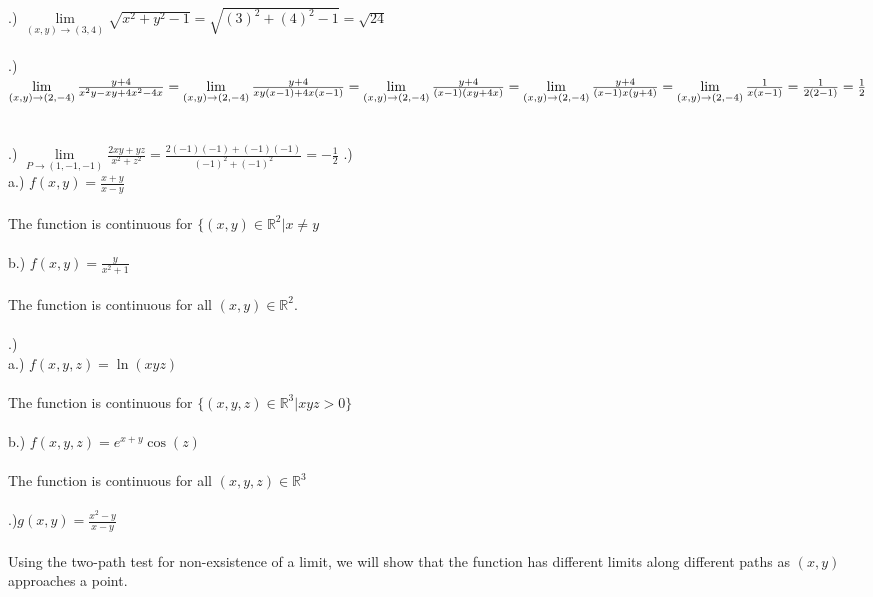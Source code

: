 \documentclass[12pt]{article}
\begin{document}
.) $\lim\limits_{(x,y) \to (3,4)} \sqrt{x^{2} + y^{2} - 1} = \sqrt{(3)^{2} + (4)^{2} -1} = \sqrt{24}$\\\\
.) $\lim\limits_{(x,y) \to (2,-4)} \frac{y+4}{x^{2}y -xy + 4x^{2} - 4x} 
\\\\= \lim\limits_{(x,y) \to (2,-4)} \frac{y+4}{xy(x-1)+4x(x-1)}
\\\\=\lim\limits_{(x,y) \to (2,-4)} \frac{y+4}{(x-1)(xy +4x)} 
\\\\=\lim\limits_{(x,y) \to (2,-4)} \frac{y+4}{(x-1)x(y +4)}
\\\\= \lim\limits_{(x,y) \to (2,-4)} \frac{1}{x(x-1)} = \frac{1}{2(2-1)} = \frac{1}{2}$\\\\\\

.) $\lim\limits_{P \to (1, -1, -1)}\frac{2xy+yz}{x^{2}+z^{2}} = \frac{2(-1)(-1) + (-1)(-1)}{(-1)^{2} + (-1)^{2}} = -\frac{1}{2}$
\clearpage
{}.) \\
\noindent a.) $f(x, y) = \frac{x+y}{x-y}$\\\\
\noindent The function is continuous for $\{ (x,y) \in \mathbb{R}^{2} | x \neq y$\\\\
\noindent b.) $f(x,y) = \frac{y}{x^{2} + 1}$\\\\
\noindent The function is continuous for all $ (x,y) \in \mathbb{R}^{2}$.\\\\
.) \\
\noindent a.) $f(x, y,z) = \ln(xyz)$\\\\
\noindent The function is continuous for $\{ (x,y,z) \in \mathbb{R}^{3} | xyz > 0\}$\\\\
\noindent b.) $f(x, y,z) = e^{x+y}\cos(z)$\\\\
\noindent The function is continuous for all $(x,y,z) \in \mathbb{R}^3$\\\\

.)$g(x,y) = \frac{x^{2}-y}{x -y}$\\\\
\noindent Using the two-path test for non-exsistence of a limit, we will show that the function has different limits along different paths as $(x,y)$ approaches a point.\\\\
\end{document}
